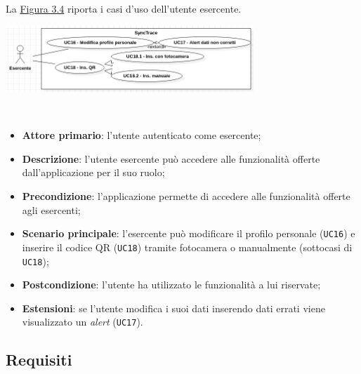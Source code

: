 La \hyperref[img:esercente]{Figura 3.4} riporta i casi d'uso dell'utente esercente.

\begin{minipage}{\linewidth}
  \label{img:esercente}
  \centering
    \includegraphics[height=2.5cm]{immagini/uc/esercente}
\end{minipage} \\

\begin{itemize}
  \item \textbf{Attore primario}: l'utente autenticato come esercente;
  \item \textbf{Descrizione}: l'utente esercente può accedere alle funzionalità offerte dall'applicazione per il suo ruolo;
  \item \textbf{Precondizione}: l'applicazione permette di accedere alle funzionalità offerte agli esercenti;
  \item \textbf{Scenario principale}: l'esercente può modificare il profilo personale (\texttt{UC16}) e inserire il codice QR (\texttt{UC18}) tramite fotocamera o manualmente (sottocasi di \texttt{UC18});
  \item \textbf{Postcondizione}: l'utente ha utilizzato le funzionalità a lui riservate;
  \item \textbf{Estensioni}: se l'utente modifica i suoi dati inserendo dati errati viene visualizzato un \textit{alert} (\texttt{UC17}).
\end{itemize}

\subsection{Requisiti}

